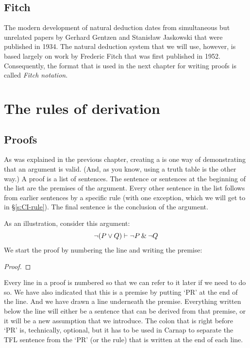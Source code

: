\section{Fitch} 

The modern development of natural deduction dates from simultaneous but unrelated papers by Gerhard Gentzen and Stanisław Jaskowski that were published in 1934. The natural deduction system that we will use, however, is based largely on work by Frederic Fitch that was first published in 1952. Consequently, the format that is used in the next chapter for writing proofs is called \textit{Fitch notation}.


\chapter{The rules of derivation}\label{s:BasicTFL}

\section{Proofs}\label{intro-proofs}

As was explained in the previous chapter, creating a  is one way of demonstrating that an argument is valid. (And, as you know, using a truth table is the  other way.) A proof is a list of sentences. The sentence or sentences at the beginning of the list are the premises of the argument. Every other sentence in the list follows from earlier sentences by a specific rule (with one exception, which we will get to in \S \ref{s:CI-rule}). The final sentence is the conclusion of the argument.

As an illustration, consider this argument:
	$${\neg} (P \vee Q) \vdash {\neg} P \mathbin{\&} {\neg} Q$$
We start the proof by numbering the line and writing the premise:
\begin{proof}
	 \pr{}
\end{proof}
Every line in a proof is numbered so that we can refer to it later if we need to do so. We have also indicated that this is a premise by putting `PR' at the end of the line. And we have drawn a line underneath the premise. Everything written below the line will either be a sentence that can be derived from that premise, or it will be a new assumption that we introduce. The colon that is right before `PR' is, technically, optional, but it has to be used in Carnap to separate the TFL sentence from the `PR' (or the rule) that is written at the end of each line.

